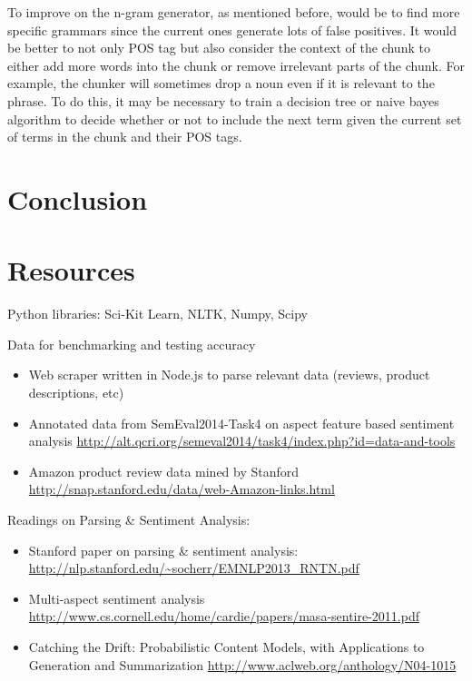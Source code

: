 \documentclass{article}
\begin{document}
To improve on the n-gram generator, as mentioned before, would be to find more specific grammars since the current ones generate lots of false positives. It would be better to not only POS tag but also consider the context of the chunk to either add more words into the chunk or remove irrelevant parts of the chunk. For example, the chunker will sometimes drop a noun even if it is relevant to the phrase. To do this, it may be necessary to train a decision tree or naive bayes algorithm to decide whether or not to include the next term given the current set of terms in the chunk and their POS tags. 


\section{Conclusion}
\section{Resources}

Python libraries: Sci-Kit Learn, NLTK, Numpy, Scipy

Data for benchmarking and testing accuracy

\begin{itemize}
\item Web scraper written in Node.js to parse relevant data (reviews, product descriptions, etc)
\newline 

\item Annotated data from SemEval2014-Task4 on aspect feature based sentiment analysis
\newline
\url{http://alt.qcri.org/semeval2014/task4/index.php?id=data-and-tools}

\item Amazon product review data mined by Stanford
\newline
\url{http://snap.stanford.edu/data/web-Amazon-links.html}
\end{itemize}

Readings on Parsing \& Sentiment Analysis:
\begin{itemize}
\item Stanford paper on parsing \& sentiment analysis:
\newline
\url{http://nlp.stanford.edu/~socherr/EMNLP2013_RNTN.pdf}

\item Multi-aspect sentiment analysis
\newline 
\url{http://www.cs.cornell.edu/home/cardie/papers/masa-sentire-2011.pdf}

\item Catching the Drift: Probabilistic Content Models, with Applications to
Generation and Summarization \newline
\url{http://www.aclweb.org/anthology/N04-1015}

\end{itemize}
\end{document}

